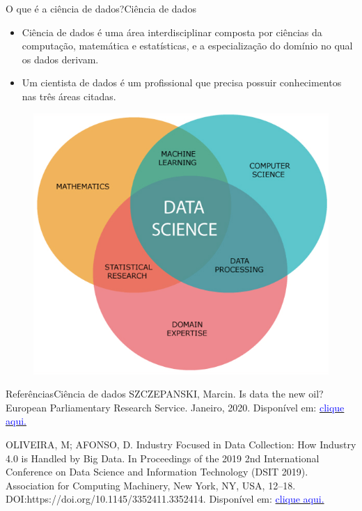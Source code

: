\documentclass[t]{beamer}
\begin{document}
\begin{ftst}{O que é a ciência de dados?}{Ciência de dados}
\small
\begin{itemize}
    \item Ciência de dados é uma área interdisciplinar composta por ciências da computação, matemática e estatísticas, e a especialização do domínio no qual os dados derivam.
    \item Um cientista de dados é um profissional que precisa possuir conhecimentos nas três áreas citadas.
\end{itemize}
\begin{figure}
    \centering
    \includegraphics[scale=0.28]{Figuras/slide00_08.png}
\end{figure}

\end{ftst}



\begin{ftst}{Referências}{Ciência de dados}
\vone
\small
SZCZEPANSKI, Marcin. Is data the new oil? European Parliamentary Research Service. Janeiro, 2020. Disponível em: \href{https://www.europarl.europa.eu/RegData/etudes/BRIE/2020/646117/EPRS_BRI(2020)646117_EN.pdf.}{\textcolor{blue}{clique aqui.}}

\vone

OLIVEIRA, M; AFONSO, D. Industry Focused in Data Collection: How Industry 4.0 is Handled by Big Data. In Proceedings of the 2019 2nd International Conference on Data Science and Information Technology (DSIT 2019). Association for Computing Machinery, New York, NY, USA, 12–18. DOI:https://doi.org/10.1145/3352411.3352414. Disponível em: \href{https://dl.acm.org/doi/10.1145/3352411.3352414}{\textcolor{blue}{clique aqui.}}

\end{ftst}
\end{document}
